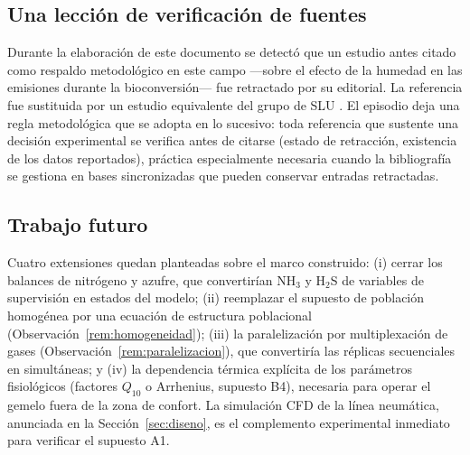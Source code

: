 \subsection{Una lección de verificación de fuentes}

Durante la elaboración de este documento se detectó que un estudio antes
citado como respaldo metodológico en este campo ---sobre el efecto de la
humedad en las emisiones durante la bioconversión--- fue retractado por su
editorial. La referencia fue sustituida por un estudio equivalente del grupo
de SLU \citep{lindbergProcessEfficiencyGreenhouse2022}. El episodio deja
una regla metodológica que se adopta en lo sucesivo: toda referencia que
sustente una decisión experimental se verifica antes de citarse (estado de
retracción, existencia de los datos reportados), práctica especialmente
necesaria cuando la bibliografía se gestiona en bases sincronizadas que
pueden conservar entradas retractadas.

\subsection{Trabajo futuro}

Cuatro extensiones quedan planteadas sobre el marco construido: (i) cerrar
los balances de nitrógeno y azufre, que convertirían NH$_3$ y H$_2$S de
variables de supervisión en estados del modelo; (ii) reemplazar el supuesto
de población homogénea por una ecuación de estructura poblacional
(Observación~\ref{rem:homogeneidad}); (iii) la paralelización por
multiplexación de gases (Observación~\ref{rem:paralelizacion}), que
convertiría las réplicas secuenciales en simultáneas; y (iv) la dependencia
térmica explícita de los parámetros fisiológicos (factores $Q_{10}$ o
Arrhenius, supuesto B4), necesaria para operar el gemelo fuera de la zona
de confort. La simulación CFD de la línea neumática, anunciada en la
Sección~\ref{sec:diseno}, es el complemento experimental inmediato para
verificar el supuesto A1.
